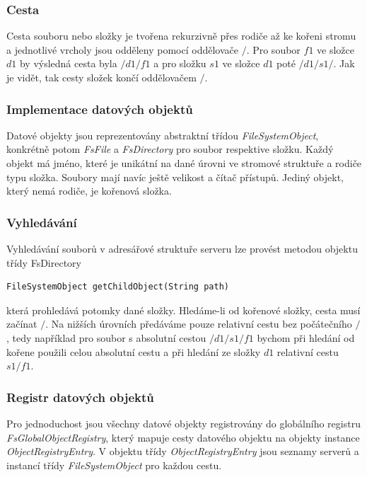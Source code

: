\documentclass[czech,DP]{thesiskiv}
\begin{document}
\subsubsection*{Cesta}
Cesta souboru nebo složky je tvořena rekurzivně přes rodiče až ke kořeni stromu a jednotlivé vrcholy jsou odděleny pomocí oddělovače $/$. Pro soubor $f1$ ve složce $d1$ by výsledná cesta byla $/d1/f1$ a pro složku $s1$ ve složce $d1$ poté $/d1/s1/$. Jak je vidět, tak cesty složek končí oddělovačem $/$.

\subsubsection*{Implementace datových objektů}
Datové objekty jsou reprezentovány abstraktní třídou \textit{FileSystemObject}, konkrétně potom \textit{FsFile} a \textit{FsDirectory} pro soubor respektive složku. Každý objekt má jméno, které je unikátní na dané úrovni ve stromové struktuře a rodiče typu složka. Soubory mají navíc ještě velikost a čítač přístupů. Jediný objekt, který nemá rodiče, je kořenová složka.

\subsubsection*{Vyhledávání}
Vyhledávání souborů v adresářové struktuře serveru lze provést metodou objektu třídy FsDirectory

\begin{verbatim}
FileSystemObject getChildObject(String path)
\end{verbatim}

\noindent která prohledává potomky dané složky. Hledáme-li od kořenové složky, cesta musí začínat $/$. Na nižších úrovních předáváme pouze relativní cestu bez počátečního $/$, tedy například pro soubor s absolutní cestou $/d1/s1/f1$ bychom při hledání od kořene použili celou absolutní cestu a při hledání ze složky $d1$ relativní cestu $s1/f1$.

\subsubsection*{Registr datových objektů}
Pro jednoduchost jsou všechny datové objekty registrovány do globálního registru \textit{FsGlobalObjectRegistry}, který mapuje cesty datového objektu na objekty instance \textit{ObjectRegistryEntry}. V objektu třídy \textit{ObjectRegistryEntry} jsou seznamy serverů a instancí třídy \textit{FileSystemObject} pro každou cestu.
\end{document}
